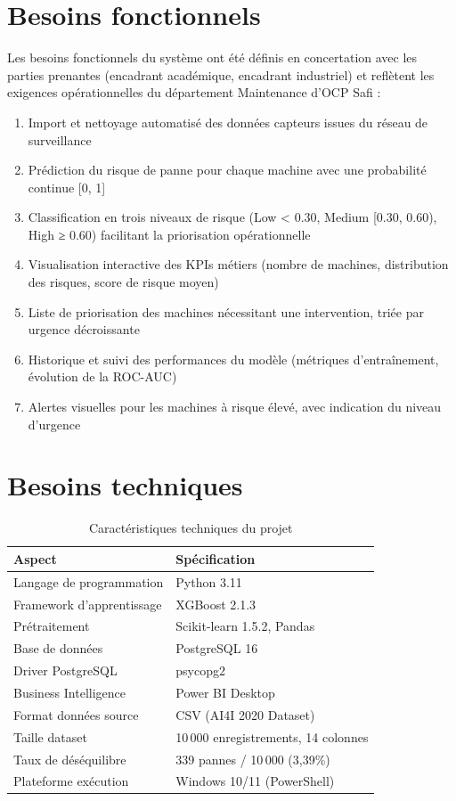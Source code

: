 \documentclass[a4paper,12pt]{report}
\begin{document}
\section{Besoins fonctionnels}

Les besoins fonctionnels du système ont été définis en concertation avec les parties prenantes (encadrant académique, encadrant industriel) et reflètent les exigences opérationnelles du département Maintenance d'OCP Safi :

\begin{enumerate}
    \item Import et nettoyage automatisé des données capteurs issues du réseau de surveillance
    \item Prédiction du risque de panne pour chaque machine avec une probabilité continue [0, 1]
    \item Classification en trois niveaux de risque (Low < 0.30, Medium [0.30, 0.60), High ≥ 0.60) facilitant la priorisation opérationnelle
    \item Visualisation interactive des KPIs métiers (nombre de machines, distribution des risques, score de risque moyen)
    \item Liste de priorisation des machines nécessitant une intervention, triée par urgence décroissante
    \item Historique et suivi des performances du modèle (métriques d'entraînement, évolution de la ROC-AUC)
    \item Alertes visuelles pour les machines à risque élevé, avec indication du niveau d'urgence
\end{enumerate}

\section{Besoins techniques}

\begin{table}[H]
\centering
\small
\caption{Caractéristiques techniques du projet}
\begin{tabular}{|l|l|}
\hline
\textbf{Aspect} & \textbf{Spécification} \\
\hline\hline
Langage de programmation & Python 3.11 \\
\hline
Framework d'apprentissage & XGBoost 2.1.3 \\
\hline
Prétraitement & Scikit-learn 1.5.2, Pandas \\
\hline
Base de données & PostgreSQL 16 \\
\hline
Driver PostgreSQL & psycopg2 \\
\hline
Business Intelligence & Power BI Desktop \\
\hline
Format données source & CSV (AI4I 2020 Dataset) \\
\hline
Taille dataset & 10\,000 enregistrements, 14 colonnes \\
\hline
Taux de déséquilibre & 339 pannes / 10\,000 (3,39\%) \\
\hline
Plateforme exécution & Windows 10/11 (PowerShell) \\
\hline
\end{tabular}
\end{table}
\end{document}
